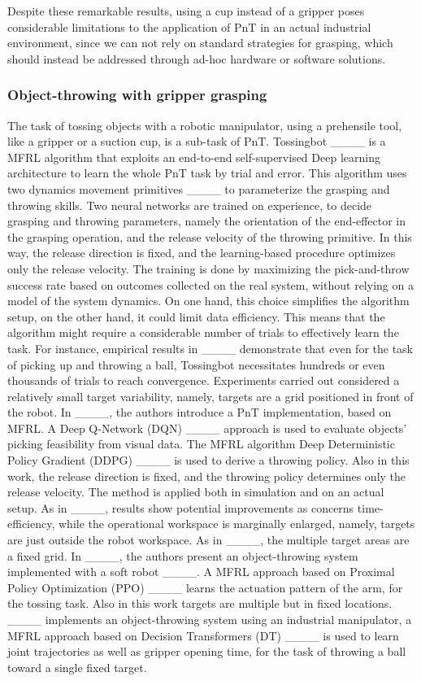 Despite these remarkable results, using a cup instead of a gripper poses considerable limitations to the application of PnT in an actual industrial environment, since we can not rely on standard strategies for grasping, which should instead be addressed through ad-hoc hardware or software solutions.


\subsubsection{Object-throwing with gripper grasping}
The task of tossing objects with a robotic manipulator, using a prehensile tool, like a gripper or a suction cup, is a sub-task of PnT. 
Tossingbot ____ is a MFRL algorithm that exploits an end-to-end self-supervised Deep learning architecture to learn the whole PnT task by trial and error. 
This algorithm uses two dynamics movement primitives 
____ to parameterize the grasping and throwing skills. 
Two neural networks are trained on experience, to decide grasping and throwing parameters, namely the orientation of the end-effector in the grasping operation, and the release velocity of the throwing primitive. In this way, the release direction is fixed, and the learning-based procedure optimizes only the release velocity. The training is done by maximizing the pick-and-throw success rate based on outcomes collected on the real system, without relying on a model of the system dynamics. 
On one hand, this choice simplifies the algorithm setup, on the other hand, it could limit data efficiency. This means that the algorithm might require a considerable number of trials to effectively learn the task. For instance, empirical results in ____ demonstrate that even for the task of picking up and throwing a ball, Tossingbot necessitates hundreds or even thousands of trials to reach convergence. Experiments carried out considered a relatively small target variability, namely, targets are a grid positioned in front of the robot. 
In ____, the authors introduce a PnT implementation, based on MFRL. A Deep Q-Network (DQN) ____ approach is used to evaluate objects' picking feasibility from visual data. The  MFRL algorithm Deep Deterministic Policy Gradient (DDPG) ____ is used to derive a throwing policy. Also in this work, the release direction is fixed, and the throwing policy determines only the release velocity. The method is applied both in simulation and on an actual setup. As in ____, results show potential improvements as concerns time-efficiency, while the operational workspace is marginally enlarged, namely, targets are just outside the robot workspace. As in ____, the multiple target areas are a fixed grid.
In ____, the authors present an object-throwing system implemented with a soft robot ____. A MFRL approach based on Proximal Policy Optimization (PPO) ____ learns the actuation pattern of the arm, for the tossing task. Also in this work targets are multiple but in fixed locations. ____ implements an object-throwing system using an industrial manipulator, a MFRL approach based on Decision Transformers (DT) ____ is used to learn joint trajectories as well as gripper opening time, for the task of throwing a ball toward a single fixed target.


